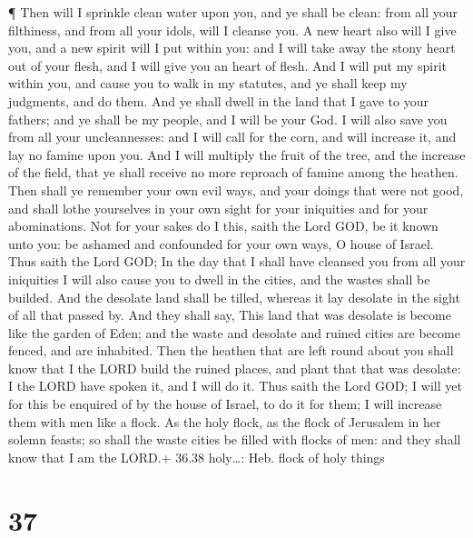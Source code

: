  ¶ Then will I sprinkle clean water upon you, and ye shall
be clean: from all your filthiness, and from all your idols, will I
cleanse you.  A new heart also will I give you, and a new
spirit will I put within you: and I will take away the stony heart out
of your flesh, and I will give you an heart of flesh.  And
I will put my spirit within you, and cause you to walk in my statutes,
and ye shall keep my judgments, and do them.  And ye shall
dwell in the land that I gave to your fathers; and ye shall be my
people, and I will be your God.  I will also save you from
all your uncleannesses: and I will call for the corn, and will increase
it, and lay no famine upon you.  And I will multiply the
fruit of the tree, and the increase of the field, that ye shall receive
no more reproach of famine among the heathen.  Then shall
ye remember your own evil ways, and your doings that were not good, and
shall lothe yourselves in your own sight for your iniquities and for
your abominations.  Not for your sakes do I this, saith the
Lord GOD, be it known unto you: be ashamed and confounded for your own
ways, O house of Israel.  Thus saith the Lord GOD; In the
day that I shall have cleansed you from all your iniquities I will also
cause you to dwell in the cities, and the wastes shall be builded.
 And the desolate land shall be tilled, whereas it lay
desolate in the sight of all that passed by.  And they
shall say, This land that was desolate is become like the garden of
Eden; and the waste and desolate and ruined cities are become fenced,
and are inhabited.  Then the heathen that are left round
about you shall know that I the LORD build the ruined places, and plant
that that was desolate: I the LORD have spoken it, and I will do it.
 Thus saith the Lord GOD; I will yet for this be enquired
of by the house of Israel, to do it for them; I will increase them with
men like a flock.  As the holy flock, as the flock of
Jerusalem in her solemn feasts; so shall the waste cities be filled with
flocks of men: and they shall know that I am the LORD.+ 36.38
holy\ldots: Heb. flock of holy things

\hypertarget{section-36}{%
\section{37}\label{section-36}}

